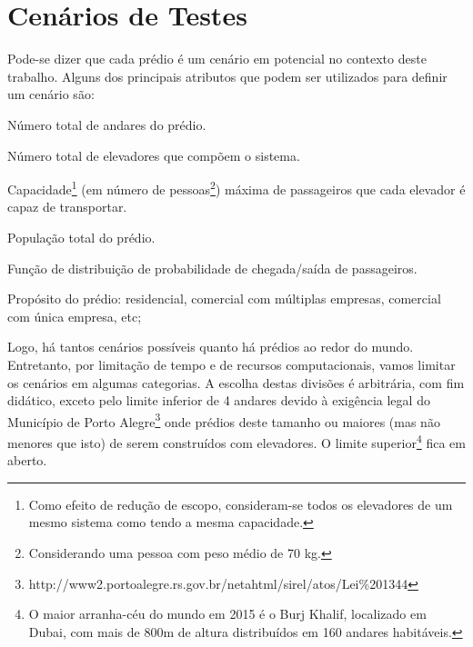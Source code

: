 \section{Cenários de Testes}

Pode-se dizer que cada prédio é um cenário em potencial no contexto deste trabalho. Alguns dos principais atributos que podem ser utilizados para definir um cenário são:

\begin{description}[leftmargin=!,labelwidth=\widthof{\bfseries Propósito}]
  \item[N]
  Número total de andares do prédio.
  \item[M]
  Número total de elevadores que compõem o sistema.
  \item[K]
  Capacidade\footnote{Como efeito de redução de escopo, consideram-se todos os
    elevadores de um mesmo sistema como tendo a mesma capacidade.} (em número de
  pessoas\footnote{Considerando uma pessoa com peso médio de 70 kg.}) máxima de passageiros que cada elevador é capaz de transportar.
  \item[P]
  População total do prédio.
  \item[F]
  Função de distribuição de probabilidade de chegada/saída de passageiros.
  \item[Propósito]
  Propósito do prédio: residencial, comercial com múltiplas empresas, comercial com única empresa, etc;
\end{description}

Logo, há tantos cenários possíveis quanto há prédios ao redor do mundo.
Entretanto, por limitação de tempo e de recursos computacionais, vamos limitar
os cenários em algumas categorias. A escolha destas divisões é arbitrária, com
fim didático, exceto pelo limite inferior de 4 andares devido à exigência legal
do Município de Porto Alegre\footnote{http://www2.portoalegre.rs.gov.br/netahtml/sirel/atos/Lei\%201344} onde prédios deste tamanho ou maiores (mas não
menores que isto) de serem construídos com elevadores. O limite
superior\footnote{O maior arranha-céu do mundo em 2015 é o Burj Khalif,
  localizado em Dubai, com mais de 800m de altura distribuídos em 160 andares habitáveis.} fica em aberto.

